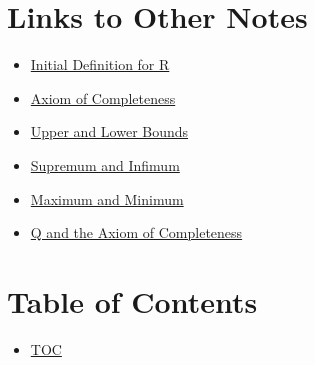 \section*{Links to Other Notes}
\begin{itemize}
  \item \hyperref[202501180703]{Initial Definition for R}
  \item \hyperref[202501180727]{Axiom of Completeness}
  \item \hyperref[202501180734]{Upper and Lower Bounds}
  \item \hyperref[202501180743]{Supremum and Infimum}
  \item \hyperref[202501181241]{Maximum and Minimum}
  \item \hyperref[202501181257]{Q and the Axiom of Completeness}
\end{itemize}

\section*{Table of Contents}

\begin{itemize}
  \item \hyperref[toc]{TOC}
\end{itemize}

